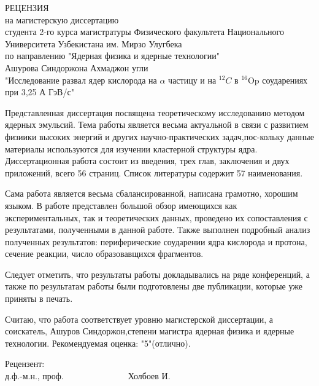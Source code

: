 \documentclass[14pt]{scrarticle}
\begin{document}
\begin{titlepage}
\begin{center}
    РЕЦЕНЗИЯ\\
    на магистерскую диссертацию\\ студента 2-го курса магистратуры Физического факультета Национального Университета Узбекистана им. Мирзо Улугбека \\по направлению "Ядерная физика и ядерные технологии"\\
    \vfill
    Ашурова Синдоржона Ахмаджон угли\\

    "Исследование развал ядер кислорода на $\alpha$ частицу и на $^{12}C$ в $^{16}$Op соударениях при 3,25 А ГэВ/с"
\end{center}

Представленная диссертация посвящена теоретическому исследованию методом ядерных эмульсий. Тема работы является весьма актуальной в связи с развитием физиики высоких энергий и других научно-практических задач,пос-кольку данные материалы используются для изучении кластерной структуры ядра. Диссертационная работа состоит из введения, трех глав, заключения и двух приложений, всего 56 страниц. Список литературы содержит 57 наименования. 

Сама работа является весьма сбалансированной, написана грамотно, хорошим языком. В работе представлен большой обзор имеющихся как экспериментальных, так и теоретических данных, проведено их сопоставления с результатами, полученными в данной работе. Также выполнен подробный анализ полученных результатов: периферические соударении ядра кислорода и протона, сечение реакции, число образовавщихся фрагментов.

Следует отметить, что результаты работы докладывались на ряде конференций, а также по результатам работы были подготовлены две публикации, которые уже приняты в печать. 

Считаю,   что   работа соответствует уровню магистерской диссертации, а соискатель, Ашуров Синдоржон,степени магистра ядерная физика и ядерные технологии. Рекомендуемая оценка: "5"(отлично).
\vfill

Рецензент:\\
д.ф.-м.н., проф.\ \ \ \ \ \ \ \ \ \ \ \ \ \ \ Холбоев И.

\vfill
\end{titlepage}
\end{document}
